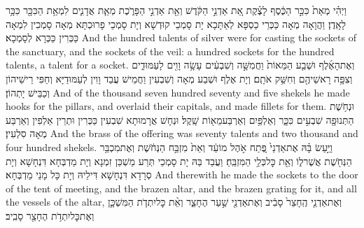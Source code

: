 {וַיְהִ֗י מְאַת֙ כִּכַּ֣ר הַכֶּ֔סֶף לָצֶ֗קֶת אֵ֚ת אַדְנֵ֣י הַקֹּ֔דֶשׁ וְאֵ֖ת אַדְנֵ֣י הַפָּרֹ֑כֶת מְאַ֧ת אֲדָנִ֛ים לִמְאַ֥ת הַכִּכָּ֖ר כִּכָּ֥ר לָאָֽדֶן׃}
{וַהֲוָאָה מְאָה כַּכְּרֵי כַסְפָּא לְאַתָּכָא יָת סָמְכֵי קוּדְשָׁא וְיָת סָמְכֵי פָרוּכְתָּא מְאָה סָמְכִין לִמְאָה כַּכְּרִין כַּכְּרָא לְסָמְכָא׃}
{And the hundred talents of silver were for casting the sockets of the sanctuary, and the sockets of the veil: a hundred sockets for the hundred talents, a talent for a socket.}{}
{וְאֶת\maqqaf הָאֶ֜לֶף וּשְׁבַ֤ע הַמֵּאוֹת֙ וַחֲמִשָּׁ֣ה וְשִׁבְעִ֔ים עָשָׂ֥ה וָוִ֖ים לָעַמּוּדִ֑ים וְצִפָּ֥ה רָאשֵׁיהֶ֖ם וְחִשַּׁ֥ק אֹתָֽם׃}
{וְיָת אֶלֶף וּשְׁבַע מְאָה וְשִׁבְעִין וַחֲמֵישׁ עֲבַד וָוִין לְעַמּוּדַיָּא וְחַפִּי רֵישֵׁיהוֹן וְכַבֵּישׁ יָתְהוֹן׃}
{And of the thousand seven hundred seventy and five shekels he made hooks for the pillars, and overlaid their capitals, and made fillets for them.}{}
{וּנְחֹ֥שֶׁת הַתְּנוּפָ֖ה שִׁבְעִ֣ים כִּכָּ֑ר וְאַלְפַּ֥יִם וְאַרְבַּע\maqqaf מֵא֖וֹת שָֽׁקֶל׃}
{וּנְחָשׁ אֲרָמוּתָא שִׁבְעִין כַּכְּרִין וּתְרֵין אַלְפִין וְאַרְבַּע מְאָה סִלְעִין׃}
{And the brass of the offering was seventy talents and two thousand and four hundred shekels.}{}
{וַיַּ֣עַשׂ בָּ֗הּ אֶת\maqqaf אַדְנֵי֙ פֶּ֚תַח אֹ֣הֶל מוֹעֵ֔ד וְאֵת֙ מִזְבַּ֣ח הַנְּחֹ֔שֶׁת וְאֶת\maqqaf מִכְבַּ֥ר הַנְּחֹ֖שֶׁת אֲשֶׁר\maqqaf ל֑וֹ וְאֵ֖ת כׇּל\maqqaf כְּלֵ֥י הַמִּזְבֵּֽחַ׃}
{וַעֲבַד בַּהּ יָת סָמְכֵי תְּרַע מַשְׁכַּן זִמְנָא וְיָת מַדְבְּחָא דִּנְחָשָׁא וְיָת סְרָדָא דִּנְחָשָׁא דִּילֵיהּ וְיָת כָּל מָנֵי מַדְבְּחָא׃}
{And therewith he made the sockets to the door of the tent of meeting, and the brazen altar, and the brazen grating for it, and all the vessels of the altar,}{}
{וְאֶת\maqqaf אַדְנֵ֤י הֶֽחָצֵר֙ סָבִ֔יב וְאֶת\maqqaf אַדְנֵ֖י שַׁ֣עַר הֶחָצֵ֑ר וְאֵ֨ת כׇּל\maqqaf יִתְדֹ֧ת הַמִּשְׁכָּ֛ן וְאֶת\maqqaf כׇּל\maqqaf יִתְדֹ֥ת הֶחָצֵ֖ר סָבִֽיב׃}

